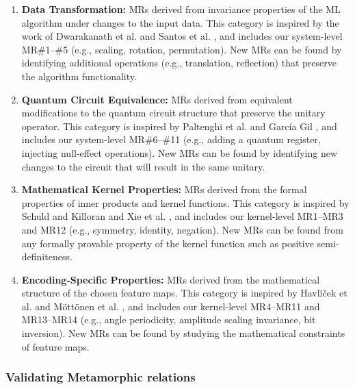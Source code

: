 \documentclass[12pt,a4paper]{article}
\begin{document}
	\begin{enumerate}
		\item \textbf{Data Transformation:} MRs derived from invariance properties of the
		ML algorithm under changes to the input data. This category
		is inspired by the work of Dwarakanath et al. \cite{Dwarakanath2018} and Santos
		et al. \cite{ssantos2020}, and includes our system-level MR\#1--\#5 (e.g., scaling,
		rotation, permutation). New MRs can be found by identifying additional
		operations (e.g., translation, reflection) that preserve the algorithm functionality.
		
		\item \textbf{Quantum Circuit Equivalence:} MRs derived from equivalent
		modifications to the quantum circuit structure that preserve the unitary operator.
		This category is inspired by Paltenghi et al. \cite{Paltenghi2023} and Garc\'ia
		Gil \cite{gracia2024}, and includes our system-level MR\#6--\#11 (e.g., adding a
		quantum register, injecting null-effect operations). New MRs can be found by
		identifying new changes to the circuit that will result in the same unitary.
		
		\item \textbf{Mathematical Kernel Properties:} MRs derived from the formal
		properties of inner products and kernel functions. This category is inspired by
		Schuld and Killoran \cite{schuld2019} and Xie et al. \cite{xie2011}, and includes
		our kernel-level MR1--MR3 and MR12 (e.g., symmetry, identity, negation). New MRs
		can be found from any formally provable property of the kernel function such as
		positive semi-definiteness.
		
		\item \textbf{Encoding-Specific Properties:} MRs derived from the mathematical
		structure of the chosen feature maps. This category is inspired by
		Havl\'i\v{c}ek et al. \cite{havlicek2019} and M\"ott\"onen et al.
		\cite{mottonen2004}, and includes our kernel-level MR4--MR11 and MR13--MR14 (e.g.,
		angle periodicity, amplitude scaling invariance, bit inversion). New MRs can be
		found by studying the mathematical constraints of feature maps.
	\end{enumerate}
	
	
	\subsubsection{Validating Metamorphic relations}
	
\end{document}
